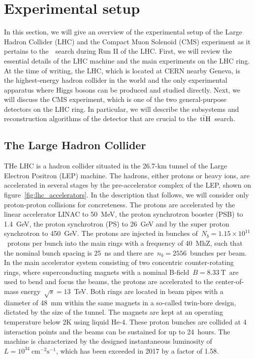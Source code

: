 \section{Experimental setup}
In this section, we will give an overview of the experimental setup of the Large Hadron Collider (LHC) and the Compact Muon Solenoid (CMS) experiment as it pertains to the~\ttH~search during Run II of the LHC. First, we will review the essential details of the LHC machine and the main experiments on the LHC ring. At the time of writing, the LHC, which is located at CERN nearby Geneva, is the highest-energy hadron collider in the world and the only experimental apparatus where Higgs bosons can be produced and studied directly. Next, we will discuss the CMS experiment, which is one of the two general-purpose detectors on the LHC ring. In particular, we will describe the subsystems and reconstruction algorithms of the detector that are crucial to the~$\mathrm{t} \bar{\mathrm{t}} \mathrm{H}$~search.

\subsection{The Large Hadron Collider}
THe LHC is a hadron collider situated in the 26.7-km tunnel of the Large Electron Positron (LEP) machine. The hadrons, either protons or heavy ions, are accelerated in several stages by the pre-accelerator complex of the LEP, shown on figure~\cref{fig:lhc_accelerators}. In the description that follows, we will consider only proton-proton collisions for concreteness. The protons are accelerated by the linear accelerator LINAC to 50~MeV, the proton synchrotron booster (PSB) to 1.4~GeV, the proton synchrotron (PS) to 26~GeV and by the super proton synchrotron to 450~GeV. The protons are injected in bunches of~$N_b = 1.15 \times 10^{11}$~protons per bunch into the main rings with a frequency of 40~MhZ, such that the nominal bunch spacing is 25~ns and there are~$n_b=2556$~bunches per beam. In the main accelerator system consisting of two concentric counter-rotating rings, where superconducting magnets with a nominal B-field~$B=8.33~\mathrm{T}$~are used to bend and focus the beams, the protons are accelerated to the center-of-mass energy~$\sqrt{s} = 13$~TeV. Both rings are located in beam pipes with a diameter of 48~mm within the same magnets in a so-called twin-bore design, dictated by the size of the tunnel. The magnets are kept at an operating temperature below 2K using liquid He-4. These proton bunches are collided at 4 interaction points and the beams can be sustained for up to 24~hours. The machine is characterized by the designed instantaneous luminosity of~$L=10^{34}~\mathrm{cm}^{-2}\mathrm{s}^{-1}$, which has been exceeded in 2017 by a factor of 1.58.

